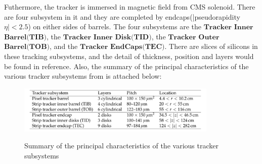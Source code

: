 			Futhermore, the tracker is immersed in magnetic field from CMS solenoid. There are four subsystem in it and they are completed by endcaps(|pseudorapidity $\eta | < 2.5$) on either sides of barrels. The four subsystems are the $\textbf{Tracker}$ $\textbf{Inner}$ $\textbf{Barrel(TIB)}$, the $\textbf{Tracker}$ $\textbf{Inner}$ $\textbf{Disk(TID)}$, the $\textbf{Tracker}$ $\textbf{Outer}$ $\textbf{Barrel(TOB)}$, and the $\textbf{Tracker}$ $\textbf{EndCaps(TEC)}$. There are slices of silicons in these tracking subsystems, and the detail of thickness, position and layers would be found in reference\cite{Chatrchyan:2014fea}. Also, the summary of the principal characteristics of the various tracker subsystems from \cite{Chatrchyan:2014fea} is attached below:
			
			\begin{figure}[H]
			\centering{}
		    	\includegraphics[width=0.85\textwidth]{Figures/ExpApparatus/summary_subtracker.png}\\
			\caption{Summary of the principal characteristics of the various tracker subsystems\cite{Chatrchyan:2014fea}}
			\label{PhysObj:fig:tracker_sum}
			\end{figure}





